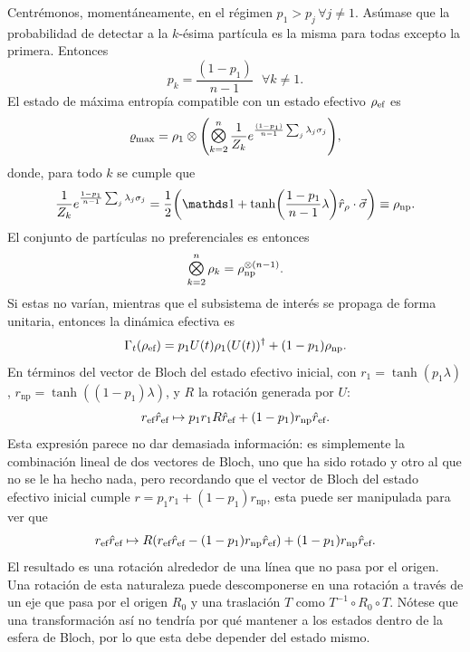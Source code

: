 Centrémonos, momentáneamente, en el régimen $p_{1}>p_{j}\,\forall j\neq 1$. Asúmase que la probabilidad de detectar a la $k$-ésima partícula es la misma para todas excepto la primera. Entonces
\begin{equation}
    p_{k}=\frac{(1-p_{1})}{n-1}\text{ }\forall k\neq 1.\nonumber
\end{equation}
El estado de máxima entropía compatible con un estado efectivo $\rho_{\text{ef}}$ es
\begin{equation}
    \varrho_{\max}=\rho_{1}\otimes\qty(\Motimes_{k=2}^{n}\frac{1}{Z_{k}}e^{\frac{(1-p_{1})}{n-1}\sum_{j}\lambda_{j}\pauli{j}}),\nonumber
\end{equation}
donde, para todo $k$ se cumple que
\begin{equation}
    \frac{1}{Z_{k}}e^{\frac{1-p_{1}}{n-1}\sum_{j}\lambda_{j}\pauli{j}}=\frac{1}{2}\qty(\Id+\tanh(\frac{1-p_{1}}{n-1}\lambda)\hat{r}_{\rho}\cdot\vec{\sigma})\equiv \rho_{\text{np}}.\nonumber
\end{equation}
El conjunto de partículas no preferenciales es entonces
\begin{equation}
    \Motimes_{k=2}^{n}\rho_{k}=\rho_{\text{np}}^{\otimes(n-1)}\nonumber.
\end{equation}
Si estas no varían, mientras que el subsistema de interés se propaga de forma unitaria, entonces la dinámica efectiva es
\begin{equation}
    \Gamma_{t}(\rho_{\text{ef}})=p_{1}U(t)\rho_{1}(U(t))^{\dag}+(1-p_{1})\rho_{\text{np}}.\nonumber
\end{equation}
En términos del vector de Bloch del estado efectivo inicial, con $r_{1}=\tanh(p_{1}\lambda)$, $r_{\text{np}}=\tanh((1-p_{1})\lambda)$, y $R$ la rotación generada por $U$:
\begin{equation}
    r_{\text{ef}}\hat{r}_{\text{ef}}\mapsto p_{1}r_{1}R\hat{r}_{\text{ef}}+(1-p_{1})r_{\text{np}}\hat{r}_{\text{ef}}.\nonumber
\end{equation}
Esta expresión parece no dar demasiada información: es simplemente la combinación lineal de dos vectores de Bloch, uno que ha sido rotado y otro al que no se le ha hecho nada, pero recordando que el vector de Bloch del estado efectivo inicial cumple $r=p_{1}r_{1}+(1-p_{1})r_{\text{np}}$, esta puede ser manipulada para ver que
\begin{equation}
    r_{\text{ef}}\hat{r}_{\text{ef}}\mapsto R(r_{\text{ef}}\hat{r}_{\text{ef}}-(1-p_{1})r_{\text{np}}\hat{r}_{\text{ef}})+(1-p_{1})r_{\text{np}}\hat{r}_{\text{ef}}.\nonumber
\end{equation}
El resultado es una rotación alrededor de una línea que no pasa por el origen. Una rotación de esta naturaleza puede descomponerse en una rotación a través de un eje que pasa por el origen $R_{0}$ y una traslación $T$ como $T^{-1}\circ R_{0}\circ T$. Nótese que una transformación así no tendría por qué mantener a los estados dentro de la esfera de Bloch, por lo que esta debe depender del estado mismo. 

